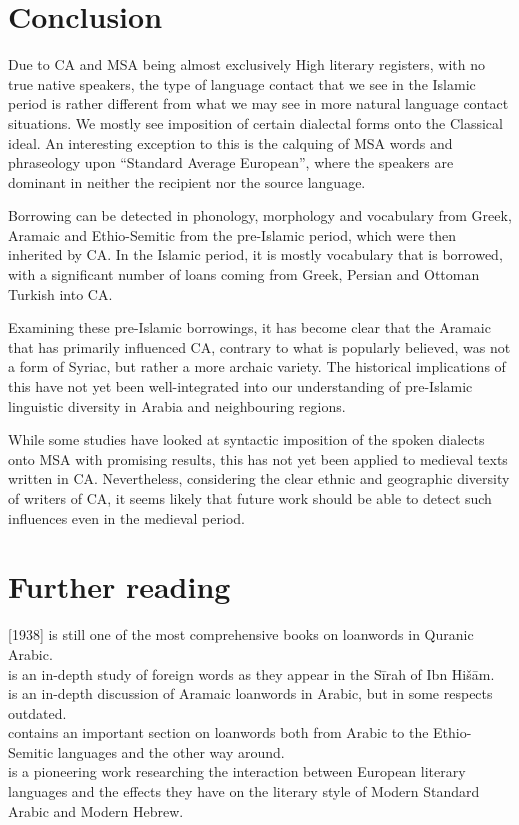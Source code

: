 \documentclass[output=paper]{langsci/langscibook}
\begin{document}
\section{Conclusion}

Due to CA and MSA being almost exclusively High literary registers, with no true native speakers, the type of language contact that we see in the Islamic period is rather different from what we may see in more natural language contact situations. We mostly see imposition of certain dialectal forms onto the Classical ideal. An interesting exception to this is the calquing of MSA words and phraseology upon “Standard Average European”, where the speakers are dominant in neither the recipient nor the source language.

Borrowing can be detected in phonology, morphology and vocabulary from Greek, Aramaic and Ethio-Semitic from the pre-Islamic period, which were then inherited by CA. In the Islamic period, it is mostly vocabulary that is borrowed, with a significant number of loans coming from Greek, Persian and Ottoman Turkish into CA.

Examining these pre-Islamic borrowings, it has become clear that the Aramaic that has primarily influenced CA, contrary to what is popularly believed, was not a form of Syriac, but rather a more archaic variety. The historical implications of this have not yet been well-integrated into our understanding of pre-Islamic linguistic diversity in Arabia and neighbouring regions.

While some studies have looked at syntactic imposition of the spoken dialects onto MSA with promising results, this has not yet been applied to medieval texts written in CA. Nevertheless, considering the clear ethnic and geographic diversity of writers of CA, it seems likely that future work should be able to detect such influences even in the medieval period.

\section*{Further reading}

\citet{Jeffrey2007} [1938] is still one of the most comprehensive books on loanwords in Quranic Arabic.\\
\citet{Hebbo1984} is an in-depth study of foreign words as they appear in the Sīrah of Ibn Hišām.\\
\citet{Fraenkel1886} is an in-depth discussion of Aramaic loanwords in Arabic, but in some respects outdated.\\
\citet{Nöldeke1910} contains an important section on loanwords both from Arabic to the Ethio-Semitic languages and the other way around.\\
\citet{Blau1969} is a pioneering work researching the interaction between European literary languages and the effects they have on the literary style of Modern Standard Arabic and Modern Hebrew.
\end{document}
